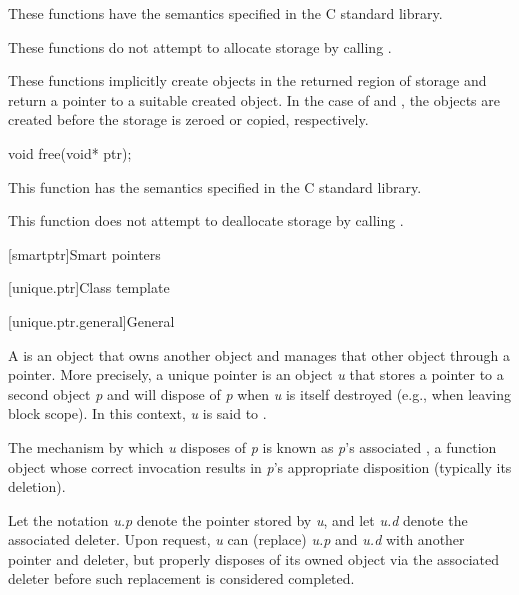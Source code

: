 \begin{itemdescr}
\pnum
\effects
These functions have the semantics specified in the C standard library.

\pnum
\remarks
These functions do not attempt to allocate
storage by calling .
%

\pnum
These functions implicitly create objects
in the returned region of storage and
return a pointer to a suitable created object.
In the case of  and ,
the objects are created before the storage is zeroed or copied, respectively.
\end{itemdescr}

%
\begin{itemdecl}
void free(void* ptr);
\end{itemdecl}

\begin{itemdescr}
\pnum
\effects
This function has the semantics specified in the C standard library.

\pnum
\remarks
This function does not attempt to
deallocate storage by calling
.
\end{itemdescr}


[smartptr]{Smart pointers}

[unique.ptr]{Class template }

[unique.ptr.general]{General}

\pnum
A  is an object that owns another object and
manages that other object through a pointer. More precisely, a unique pointer
is an object \textit{u} that stores a pointer to a second object \textit{p} and
will dispose of \textit{p} when \textit{u} is itself destroyed (e.g., when
leaving block scope). In this context, \textit{u} is said
to  .

\pnum
The mechanism by which \textit{u} disposes of \textit{p} is known as
\textit{p}'s associated , a function object whose correct
invocation results in \textit{p}'s appropriate disposition (typically its deletion).

\pnum
Let the notation \textit{u.p} denote the pointer stored by \textit{u}, and
let \textit{u.d} denote the associated deleter. Upon request, \textit{u} can
 (replace) \textit{u.p} and \textit{u.d} with another pointer and
deleter, but properly disposes of its owned object via the associated
deleter before such replacement is considered completed.

